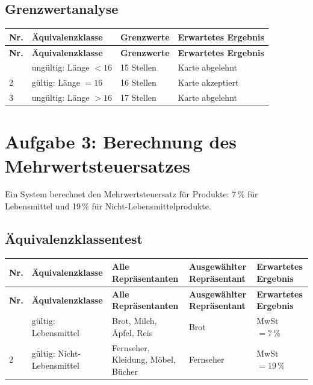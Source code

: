 \documentclass[
	fontsize=12pt,          %
	paper=a4,               %
	numbers=noenddot,       %
	listof=totoc,           %
	listof=entryprefix,     %
	listof=nochaptergap,    %
	bibliography=totoc,     %
	parskip=half,           %
	openany                 %
]{scrbook}
\begin{document}
\section*{Grenzwertanalyse}

\begin{longtable}{| p{0.5cm} | p{4.0cm} | p{4.5cm} | p{3.8cm} |}
	\hline
	\textbf{Nr.} & \textbf{Äquivalenzklasse} & \textbf{Grenzwerte} & \textbf{Erwartetes Ergebnis} \\ \hline
	\endfirsthead
	\hline
	\textbf{Nr.} & \textbf{Äquivalenzklasse} & \textbf{Grenzwerte} & \textbf{Erwartetes Ergebnis} \\ \hline
	\endhead
	\hline
	\endfoot
	1 & ungültig: Länge $< 16$ & 15 Stellen & Karte abgelehnt \\ \hline
	2 & gültig: Länge $= 16$ & 16 Stellen & Karte akzeptiert \\ \hline
	3 & ungültig: Länge $> 16$ & 17 Stellen & Karte abgelehnt \\ \hline
\end{longtable}


\chapter*{Aufgabe 3: Berechnung des Mehrwertsteuersatzes}

Ein System berechnet den Mehrwertsteuersatz für Produkte: 7\,\% für Lebensmittel und 19\,\% für Nicht-Lebensmittelprodukte.

\section*{Äquivalenzklassentest}

\begin{longtable}{| p{0.5cm} | p{3.5cm} | p{3.8cm} | p{2.5cm} | p{2.8cm} |}
	\hline
	\textbf{Nr.} & \textbf{Äquivalenzklasse} & \textbf{Alle Repräsentanten} & \textbf{Ausgewählter Repräsentant} & \textbf{Erwartetes Ergebnis} \\ \hline
	\endfirsthead
	\hline
	\textbf{Nr.} & \textbf{Äquivalenzklasse} & \textbf{Alle Repräsentanten} & \textbf{Ausgewählter Repräsentant} & \textbf{Erwartetes Ergebnis} \\ \hline
	\endhead
	\hline
	\endfoot
	1 & gültig: Lebensmittel & Brot, Milch, Äpfel, Reis & Brot & MwSt $= 7\,\%$ \\ \hline
	2 & gültig: Nicht-Lebensmittel & Fernseher, Kleidung, Möbel, Bücher & Fernseher & MwSt $= 19\,\%$ \\ \hline
\end{longtable}
\end{document}

